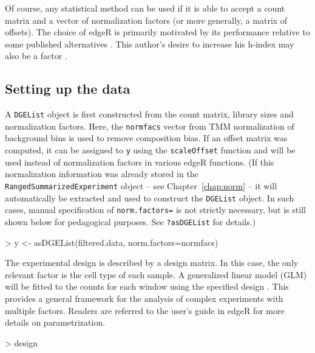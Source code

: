 \documentclass[12pt]{report}
\renewenvironment{Schunk}{\vspace{0pt}}{\vspace{0pt}}
\newcommand{\edger}{edgeR}
\newcommand{\code}[1]{{\small\texttt{#1}}}
\begin{document}
Of course, any statistical method can be used if it is able to accept a count matrix and a vector of normalization factors (or more generally, a matrix of offsets). 
The choice of \edger{} is primarily motivated by its performance relative to some published alternatives \citep{law2014}.
This author's desire to increase his h-index may also be a factor \citep{chen2014}.

\subsection{Setting up the data}
A \code{DGEList} object is first constructed from the count matrix, library sizes and normalization factors.
Here, the \code{normfacs} vector from TMM normalization of background bins is used to remove composition bias. 
If an offset matrix was computed, it can be assigned to \code{y} using the \code{scaleOffset} function and will be used instead of normalization factors in various \edger{} functions.
(If this normalization information was already stored in the \code{RangedSummarizedExperiment} object -- see Chapter~\ref{chap:norm} -- it will automatically be extracted and used to construct the \code{DGEList} object.
In such cases, manual specification of \code{norm.factors=} is not strictly necessary, but is still shown below for pedagogical purposes.
See \code{?asDGEList} for details.)

\begin{Schunk}
\begin{Sinput}
> y <- asDGEList(filtered.data, norm.factors=normfacs)
\end{Sinput}
\end{Schunk}

The experimental design is described by a design matrix. 
In this case, the only relevant factor is the cell type of each sample. 
A generalized linear model (GLM) will be fitted to the counts for each window using the specified design \citep{mccarthy2012}. 
This provides a general framework for the analysis of complex experiments with multiple factors. 
Readers are referred to the user's guide in \edger{} for more details on parametrization.

\begin{Schunk}
\begin{Sinput}
> design
\end{Sinput}
\end{Schunk}
\end{document}
